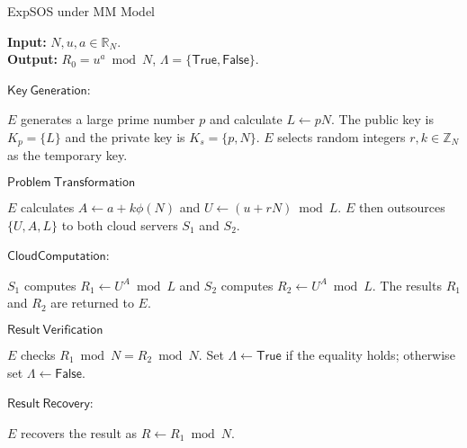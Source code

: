 \documentclass[english,draftcls,onecolumn,11pt]{IEEEtran}
\theoremstyle{definition}
\theoremstyle{plain}
\theoremstyle{plain}
\theoremstyle{definition}
\begin{document}
\begin{algorithm}[tbh]
\caption{ExpSOS under MM Model\label{alg:CryptSOS-under-MM}}

\smallskip 
\textbf{Input:} $N,u,a\in\mathbb{R}_N$.\\
\textbf{Output:} $R_0=u^a\bmod N$, $\Lambda=\{\mathsf{True},\mathsf{False}\}.$

$\mathsf{Key~Generation}$:
\begin{algorithmic}[1]
\STATE $E$ generates a large prime number $p$ and calculate $L\leftarrow pN$. The public key is $K_{p}=\{L\}$ and the private key is $K_s=\{p,N\}$.
\STATE $E$ selects random integers $r,k\in\mathbb{Z}_N$ as the temporary key.
\end{algorithmic}

$\mathsf{Problem~Transformation}$
\begin{algorithmic}[1]
\STATE $E$ calculates $A\leftarrow a+k\phi(N)$ and $U\leftarrow (u+rN)\bmod L$. 
\STATE $E$ then outsources $\{U,A,L \}$ to both  cloud servers $S_1$ and $S_2$.
\end{algorithmic}

$\mathsf{Cloud Computation}$:
\begin{algorithmic}[1]
\STATE  $S_1$ computes $R_1\leftarrow U^A\bmod L$ and $S_2$ computes $R_2\leftarrow U^A\bmod L$. 
\STATE The results $R_1$ and $R_2$ are returned to $E$.
\end{algorithmic}

$\mathsf{Result~Verification}$
\begin{algorithmic}[1]
\STATE $E$ checks $R_1\bmod N=R_2\bmod N$. Set $\Lambda \leftarrow  \mathsf{True}$ if the equality holds; otherwise set $\Lambda \leftarrow  \mathsf{False}$.
\end{algorithmic}

$\mathsf{Result~Recovery}$:
\begin{algorithmic}[1]
\STATE $E$ recovers the result as $R \leftarrow  R_1\bmod N$.
\end{algorithmic}
\end{algorithm}
\end{document}

